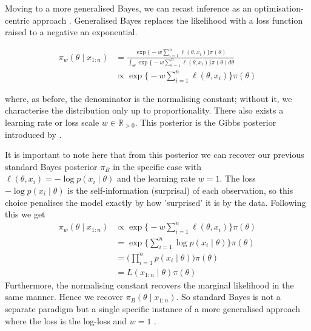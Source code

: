 \documentclass[mstat,12pt]{unswthesis}
\begin{document}
Moving to a more generalised Bayes, we can recast inference as an optimisation-centric approach \cite{knoblauch2022optimization}. Generalised Bayes replaces the likelihood with a loss function raised to a negative an exponential.

\begin{align}
    \pi_{w}(\theta \mid x_{1:n}) & = \frac{\exp\big\{-w\sum_{i=1}^{n}\ell(\theta, x_i)\big\}\pi(\theta)}{\displaystyle\int_{\Theta}\exp\big\{-w\sum_{i=1}^{n}\ell(\theta, x_i)\big\}\pi(\theta)d\theta} \nonumber \\
                                 & \propto \exp\big\{-w\sum_{i=1}^{n}\ell(\theta, x_i)\big\}\pi(\theta)
\end{align}

where, as before, the denominator is the normalising constant; without it, we characterise the distribution only up to proportionality. There also exists a learning rate or loss scale $w \in \mathbb{R}_{>0}$. This posterior is the Gibbs posterior introduced by \citet{bissiri2016general}.


It is important to note here that from this posterior we can recover our previous standard Bayes posterior $\pi_{B}$ in the specific case with $\ell(\theta, x_i) = -\log p(x_i \mid \theta)$ and the learning rate $w = 1$. The loss $-\log p(x_i\mid\theta)$ is the self-information (surprisal) of each observation, so this choice penalises the model exactly by how 'surprised' it is by the data. Following this we get
\begin{align*}
    \pi_w(\theta \mid x_{1:n}) & \propto \exp\Big\{-w\sum_{i=1}^{n}\ell(\theta, x_i)\Big\}\pi(\theta) \\
                               & = \exp\Big\{\sum_{i=1}^{n}\log p(x_i \mid \theta)\Big\}\pi(\theta)   \\
                               & = \Big(\prod_{i=1}^{n} p(x_i \mid \theta)\Big)\pi(\theta)            \\
                               & = L(x_{1:n}\mid\theta)\pi(\theta)
\end{align*}
Furthermore, the normalising constant recovers the marginal likelihood in the same manner. Hence we recover $\pi_B(\theta \mid x_{1:n})$. So standard Bayes is not a separate paradigm but a single specific instance of a more generalised approach where the loss is the log-loss and $w = 1$ \cite{knoblauch2022optimization}.
\vspace{1.5em}
\end{document}
